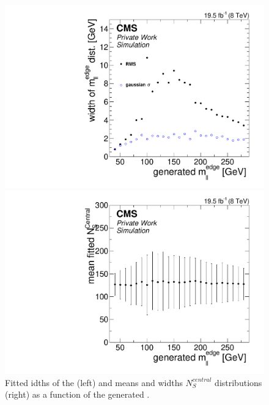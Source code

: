 \begin{figure}[!hbp]
  \centering
  \begin{minipage}[t]{0.49\textwidth}
    \includegraphics[width=\textwidth]{plots/results/fit/toyResults/WidthsvsGenM0Ratio_signalInjectedN125.pdf}
  \end{minipage}
  \begin{minipage}[t]{0.49\textwidth}
    \includegraphics[width=\textwidth]{plots/results/fit/toyResults/meanNSvsGenM0_signalInjectedN125.pdf}
  \end{minipage}
  \caption{Fitted idths of the \mlledge (left) and means and widths $N_S^{central}$ distributions (right) as a function of the generated \mlledge.}
    \label{fig:toys:scanFits}
\end{figure}

